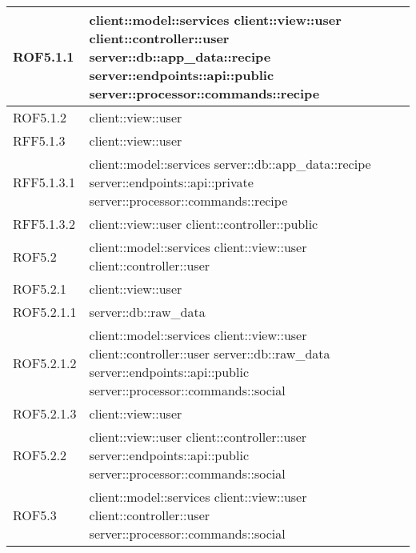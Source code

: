 \begin{center}
\begin{longtable}{| p{4cm} | p{8cm} |}
\hline
ROF5.1.1 & client::model::services \newline client::view::user \newline client::controller::user \newline server::db::app\_data::recipe \newline server::endpoints::api::public \newline server::processor::commands::recipe \\
\hline
ROF5.1.2 & client::view::user \\
\hline
RFF5.1.3 & client::view::user \\
\hline
RFF5.1.3.1 & client::model::services \newline server::db::app\_data::recipe \newline server::endpoints::api::private \newline server::processor::commands::recipe \\
\hline
RFF5.1.3.2 & client::view::user \newline client::controller::public \\
\hline
ROF5.2 & client::model::services \newline client::view::user \newline client::controller::user \\
\hline
ROF5.2.1 & client::view::user \\
\hline
ROF5.2.1.1 & server::db::raw\_data \\
\hline
ROF5.2.1.2 & client::model::services \newline client::view::user \newline client::controller::user \newline server::db::raw\_data \newline server::endpoints::api::public \newline server::processor::commands::social \\
\hline
ROF5.2.1.3 & client::view::user \\
\hline
ROF5.2.2 & client::view::user \newline client::controller::user \newline server::endpoints::api::public \newline server::processor::commands::social \\
\hline
ROF5.3 & client::model::services \newline client::view::user \newline client::controller::user \newline server::processor::commands::social \\

\end{longtable}
\end{center}

